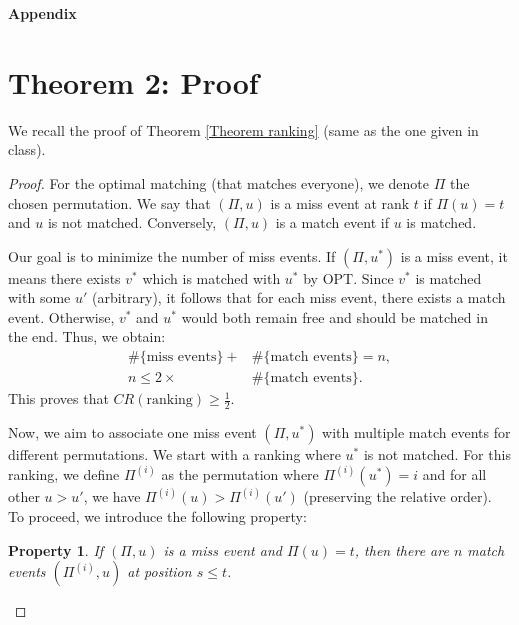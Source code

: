 \documentclass[12pt, twocolumn]{article}
\newtheorem{property}{Property}
\begin{document}
\clearpage
\onecolumn

\clearpage

\printbibliography
\clearpage
\null
\vfill
\begin{center}
\huge\textbf{Appendix}
\end{center}
\vfill
\thispagestyle{empty}
\newpage

\appendix

\section{Theorem 2: Proof}

We recall the proof of Theorem \ref{Theorem ranking} (same as the one given in class).

\begin{proof}
    For the optimal matching (that matches everyone), we denote $\Pi$ the chosen permutation. We say that $(\Pi, u)$ is a miss event at rank $t$ if $\Pi(u) = t$ and $u$ is not matched. Conversely, $(\Pi, u)$ is a match event if $u$ is matched.
    
    Our goal is to minimize the number of miss events. If $(\Pi, u^*)$ is a miss event, it means there exists $v^*$ which is matched with $u^*$ by OPT. Since $v^*$ is matched with some $u'$ (arbitrary), it follows that for each miss event, there exists a match event. Otherwise, $v^*$ and $u^*$ would both remain free and should be matched in the end. Thus, we obtain:
    \begin{align*}
        \#\{\text{miss events}\} + &\#\{\text{match events}\} = n, \\
        n \leq 2 \times &\#\{\text{match events}\}.
    \end{align*}
    This proves that $CR(\text{ranking}) \geq \frac{1}{2}$.
    
    Now, we aim to associate one miss event $(\Pi, u^*)$ with multiple match events for different permutations. We start with a ranking where $u^*$ is not matched. For this ranking, we define $\Pi^{(i)}$ as the permutation where $\Pi^{(i)}(u^*) = i$ and for all other $u > u'$, we have $\Pi^{(i)}(u) > \Pi^{(i)}(u')$ (preserving the relative order). To proceed, we introduce the following property:
    
    \begin{property}
        If $(\Pi, u)$ is a miss event and $\Pi(u) = t$, then there are $n$ match events $(\Pi^{(i)}, u)$ at position $s \leq t$.
    \end{property}
    

\end{proof}
\end{document}
